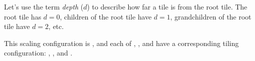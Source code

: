 

Let's use the term \emph{depth} ($d$) to describe how far a tile is from the root tile.
The root tile has $d=0$, children of the root tile have $d=1$, grandchildren of the root tile have $d=2$, etc.

This scaling configuration is \UTinf{}, and each of , , and  have a corresponding tiling configuration: , , and .






